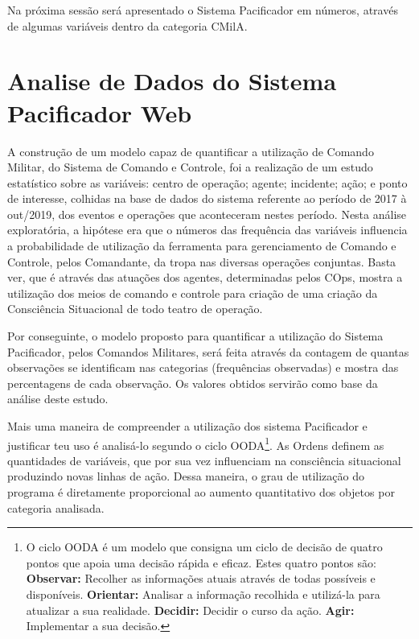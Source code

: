 \hspace{1.5cm}
Na próxima sessão será apresentado o Sistema Pacificador em números, através de algumas variáveis dentro da categoria CMilA.
\section*{Analise de Dados do Sistema Pacificador Web}
\hspace{1.5cm}
A construção de um modelo capaz de quantificar a utilização de Comando Militar, do Sistema de Comando e Controle, foi a realização de um estudo estatístico sobre as variáveis: centro de operação; agente; incidente; ação; e ponto de interesse,  colhidas na base de dados do sistema referente ao período de 2017 à out/2019, dos eventos e operações que aconteceram nestes período. Nesta análise exploratória, a hipótese era que o números das frequência das variáveis influencia a probabilidade de utilização da ferramenta para gerenciamento de Comando e Controle, pelos Comandante, da tropa nas diversas operações conjuntas. Basta ver, que é através das atuações dos agentes, determinadas pelos COps, mostra a utilização dos meios de comando e controle para criação de uma criação da Consciência Situacional de todo teatro de operação. 

\hspace{1.5cm}
Por conseguinte, o modelo proposto para quantificar a utilização do Sistema Pacificador, pelos Comandos Militares, será feita através da contagem de quantas observações se identificam nas categorias (frequências observadas) e mostra das percentagens de cada observação. Os valores obtidos servirão como base da análise deste estudo. 

\hspace{1.5cm}
Mais uma maneira de compreender a utilização dos sistema Pacificador e justificar teu uso é analisá-lo segundo o ciclo OODA\footnote{O ciclo OODA é um modelo que consigna um ciclo de decisão de quatro pontos que apoia uma decisão rápida e eficaz. Estes quatro pontos são: \textbf{Observar: }Recolher as informações atuais através de todas possíveis e disponíveis. \textbf{Orientar: }Analisar a informação recolhida e utilizá-la para atualizar a sua realidade. \textbf{Decidir: }Decidir o curso da ação. \textbf{Agir: }Implementar a sua decisão.}. As Ordens definem as quantidades de variáveis, que por sua vez influenciam na consciência situacional produzindo novas linhas de ação. Dessa maneira, o grau de utilização do programa é diretamente proporcional ao aumento quantitativo dos objetos por categoria analisada.

